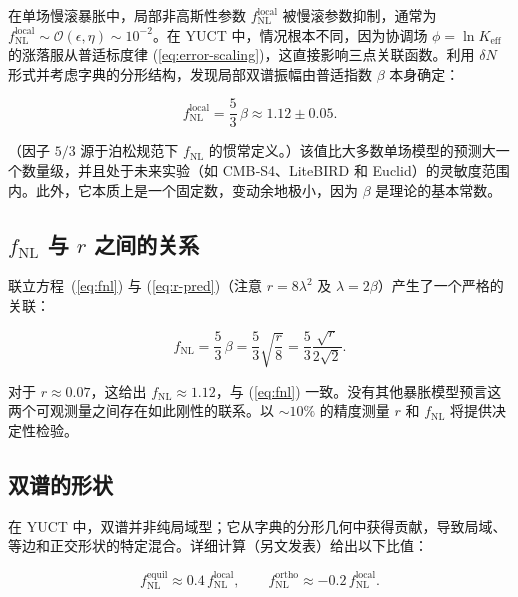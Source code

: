 \documentclass[11pt,a4paper]{article}
\newcommand{\Keff}{K_{\mathrm{eff}}}
\begin{document}
	在单场慢滚暴胀中，局部非高斯性参数 \(f_{\text{NL}}^{\text{local}}\) 被慢滚参数抑制，通常为 \(f_{\text{NL}}^{\text{local}} \sim \mathcal{O}(\epsilon, \eta) \sim 10^{-2}\)。在 YUCT 中，情况根本不同，因为协调场 \(\phi = \ln \Keff\) 的涨落服从普适标度律 (\ref{eq:error-scaling})，这直接影响三点关联函数。利用 \(\delta N\) 形式并考虑字典的分形结构，发现局部双谱振幅由普适指数 \(\beta\) 本身确定：
	
	\begin{equation}
		f_{\text{NL}}^{\text{local}} = \frac{5}{3}\,\beta \approx 1.12 \pm 0.05.
		\label{eq:fnl}
	\end{equation}
	
	（因子 \(5/3\) 源于泊松规范下 \(f_{\text{NL}}\) 的惯常定义。）该值比大多数单场模型的预测大一个数量级，并且处于未来实验（如 CMB‑S4、LiteBIRD 和 Euclid）的灵敏度范围内。此外，它本质上是一个固定数，变动余地极小，因为 \(\beta\) 是理论的基本常数。
	
	\subsection{\(f_{\text{NL}}\) 与 \(r\) 之间的关系}
	
	联立方程~(\ref{eq:fnl}) 与 (\ref{eq:r-pred})（注意 \(r = 8\lambda^2\) 及 \(\lambda = 2\beta\)）产生了一个严格的关联：
	
	\begin{equation}
		f_{\text{NL}} = \frac{5}{3}\,\beta = \frac{5}{3}\sqrt{\frac{r}{8}} = \frac{5}{3}\frac{\sqrt{r}}{2\sqrt{2}}.
		\label{eq:fnl-r}
	\end{equation}
	
	对于 \(r \approx 0.07\)，这给出 \(f_{\text{NL}} \approx 1.12\)，与 (\ref{eq:fnl}) 一致。没有其他暴胀模型预言这两个可观测量之间存在如此刚性的联系。以 \(\sim 10\%\) 的精度测量 \(r\) 和 \(f_{\text{NL}}\) 将提供决定性检验。
	
	\subsection{双谱的形状}
	
	在 YUCT 中，双谱并非纯局域型；它从字典的分形几何中获得贡献，导致局域、等边和正交形状的特定混合。详细计算（另文发表）给出以下比值：
	
	\begin{equation}
		f_{\text{NL}}^{\text{equil}} \approx 0.4\, f_{\text{NL}}^{\text{local}}, \qquad
		f_{\text{NL}}^{\text{ortho}} \approx -0.2\, f_{\text{NL}}^{\text{local}}.
		\label{eq:fnl-shapes}
	\end{equation}
	
\end{document}
